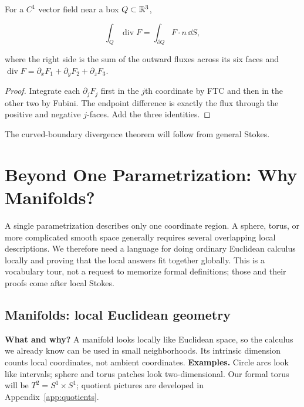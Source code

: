 \begin{proposition}
For a $C^1$ vector field near a box $Q\subset\mathbb{R}^3$,

\[
\int_Q\operatorname{div}F=\int_{\partial Q}F\cdot n\,\dd S,
\]

where the right side is the sum of the outward fluxes across its six faces
and $\operatorname{div}F=\partial_xF_1+\partial_yF_2+\partial_zF_3$.
\end{proposition}
\begin{proof}
Integrate each $\partial_jF_j$ first in the $j$th coordinate by FTC and
then in the other two by Fubini. The endpoint difference is exactly the
flux through the positive and negative $j$-faces. Add the three identities.
\end{proof}
The curved-boundary divergence theorem will follow from general Stokes.

\section{Beyond One Parametrization: Why Manifolds?}
\label{sec:manifold-preview}
A single parametrization describes only one coordinate region. A sphere,
torus, or more complicated smooth space generally requires several
overlapping local descriptions. We therefore need a language for doing
ordinary Euclidean calculus locally and proving that the local answers fit
together globally. This is a vocabulary tour, not a request to memorize
formal definitions; those and their proofs come after local Stokes.

\subsection*{Manifolds: local Euclidean geometry}
\textbf{What and why?} A manifold looks locally like Euclidean space, so
the calculus we already know can be used in small neighborhoods.
Its intrinsic dimension counts local coordinates, not ambient coordinates.
\textbf{Examples.} Circle arcs look like intervals; sphere and torus patches
look two-dimensional. Our formal torus will be $T^2=S^1\times S^1$;
quotient pictures are developed in Appendix~\ref{app:quotients}.

